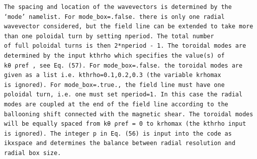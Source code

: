 \documentclass[a4paper]{article}
\newcommand{\gkwpagefont}{\fontsize{6.0pt}{7.55pt}\selectfont}
\begin{document}
\begin{Verbatim}[fontsize=\gkwpagefont]
    The spacing and location of the wavevectors is determined by the ‘mode’ namelist. For mode_box=.false. there is only one radial
wavevector considered, but the field line can be extended to take more than one poloidal turn by setting nperiod. The total number
of full poloidal turns is then 2*nperiod - 1. The toroidal modes are determined by the input kthrho which specifies the value(s) of
kθ ρref , see Eq. (57). For mode_box=.false. the toroidal modes are given as a list i.e. kthrho=0.1,0.2,0.3 (the variable krhomax
is ignored). For mode_box=.true., the field line must have one poloidal turn, i.e. one must set nperiod=1. In this case the radial
modes are coupled at the end of the field line according to the ballooning shift connected with the magnetic shear. The toroidal modes
will be equally spaced from kθ ρref = 0 to krhomax (the kthrho input is ignored). The integer p in Eq. (56) is input into the code as
ikxspace and determines the balance between radial resolution and radial box size.
\end{Verbatim}
\newpage
\end{document}
